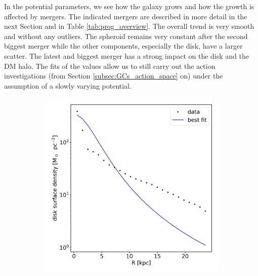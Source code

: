 \begin{figure}
\end{figure}
In the potential parameters, we see how the galaxy grows and how the growth is affected by mergers. The indicated mergers are described in more detail in the next Section and in Table \ref{tab:prog_overview}. The overall trend is very smooth and without any outliers. The spheroid remains very constant after the second biggest merger while the other components, especially the disk, have a larger scatter. The latest and biggest merger has a strong impact on the disk and the \ac{DM} halo. The fits of the values allow us to still carry out the action investigations (from Section \ref{subsec:GCs_action_space} on) under the assumption of a slowly varying potential. 

\iffalse
\begin{figure}
\captionsetup{format=plain}
    \centering
    \begin{subfigure}[b]{0.3\textwidth}
	    \includegraphics[width=\textwidth]{plots/Auriga/surface_dens_disk_fit_data.png}
	    \label{fig:disk_surfdens_fit}
    \end{subfigure}
    ~ %
    \begin{subfigure}[b]{0.3\textwidth}
    \centering

\end{subfigure}
\end{figure}
